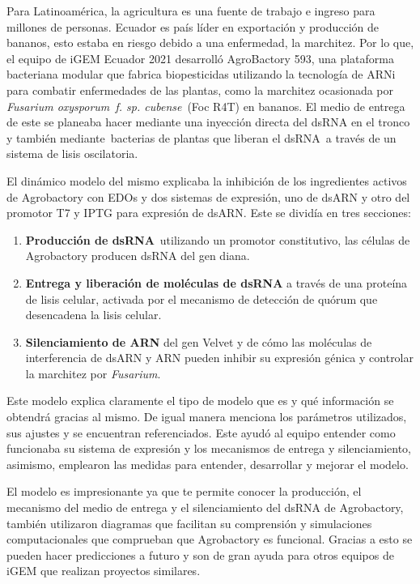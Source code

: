 \documentclass[11pt, letterpaper, spanish]{article}
\begin{document}
{{\par{Para Latinoamérica, la agricultura es una fuente de trabajo e ingreso para millones de personas. Ecuador es país líder en exportación y producción de bananos, esto estaba en riesgo debido a una enfermedad, la marchitez. Por lo que, el equipo de iGEM Ecuador 2021 desarrolló AgroBactory 593, una plataforma bacteriana modular que fabrica biopesticidas utilizando la tecnología de ARNi para combatir enfermedades de las plantas, como la marchitez ocasionada por \textit{Fusarium oxysporum f. sp. cubense} (Foc R4T) en bananos. El medio de entrega de este se planeaba hacer mediante una inyección directa del dsRNA en el tronco y también mediante bacterias de plantas que liberan el dsRNA a través de un sistema de lisis oscilatoria.} 
\par{El dinámico modelo del mismo explicaba la inhibición de los ingredientes activos de Agrobactory con EDOs y dos sistemas de expresión, uno de dsARN y otro del promotor T7 y IPTG para expresión de dsARN.  Este se dividía en tres secciones:}
\begin{enumerate}[1.]
            \item \textbf{Producción de dsRNA} utilizando un promotor constitutivo, las células de Agrobactory producen dsRNA del gen diana.
            \item \textbf{Entrega y liberación de moléculas de dsRNA} a través de una proteína de lisis celular, activada por el mecanismo de detección de quórum que desencadena la lisis celular.
            \item \textbf{Silenciamiento de ARN} del gen Velvet y de cómo las moléculas de interferencia de dsARN y ARN pueden inhibir su expresión génica y controlar la marchitez por \textit{Fusarium}.
\end{enumerate}
\par{Este modelo explica claramente el tipo de modelo que es y qué información se obtendrá gracias al mismo. De igual manera menciona los parámetros utilizados, sus ajustes y se encuentran referenciados. Este ayudó al equipo entender como funcionaba su sistema de expresión y los mecanismos de entrega y silenciamiento, asimismo, emplearon las medidas para entender, desarrollar y mejorar el modelo. }

\par{El modelo es impresionante ya que te permite conocer la producción, el mecanismo del medio de entrega y el silenciamiento del dsRNA de Agrobactory, también utilizaron diagramas que facilitan su comprensión y simulaciones computacionales que comprueban que Agrobactory es funcional. Gracias a esto se pueden hacer predicciones a futuro y son de gran ayuda para otros equipos de iGEM que realizan proyectos similares. }



}}
\end{document}
